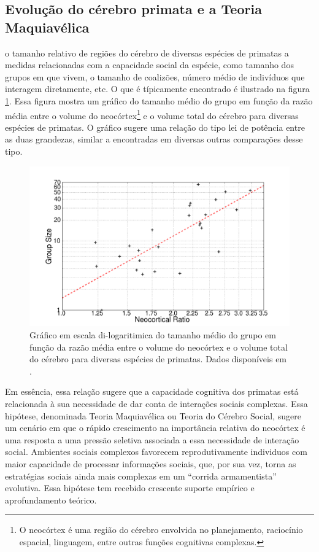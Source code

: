 \subsection{Evolução do cérebro primata e a Teoria Maquiavélica}
 o tamanho relativo de regiões do cérebro de diversas espécies de primatas a medidas relacionadas com a capacidade social da espécie, como tamanho dos grupos em que vivem, o tamanho de coalizões, número médio de indivíduos que interagem diretamente, etc. O que é típicamente encontrado é ilustrado na figura \ref{fig:dunbarlaw}. Essa figura mostra um gráfico do tamanho médio do grupo em função da razão média entre o volume do neocórtex\footnote[][-2cm]{O neocórtex é uma região do cérebro envolvida no planejamento, raciocínio espacial, linguagem, entre outras funções cognitivas complexas.} e o volume total do cérebro para diversas espécies de primatas. O gráfico sugere uma relação do tipo lei de potência entre as duas grandezas, similar a encontradas em diversas outras comparações desse tipo. 
\begin{figure}
	\centering
	\includegraphics[width = \textwidth]{figuras/dunbar.png}
	\caption[Gráfico em escala di-logaritimica do tamanho médio do grupo em função da razão média entre o volume do neocórtex e o volume total do cérebro para diversas espécies de primatas.]{ Gráfico em escala di-logaritimica do tamanho médio do grupo em função da razão média entre o volume do neocórtex e o volume total do cérebro para diversas espécies de primatas. Dados disponíveis em \citep{Dunbar2009}.}
	\label{fig:dunbarlaw}
\end{figure}
Em essência, essa relação sugere que a capacidade cognitiva dos primatas está relacionada à sua necessidade de dar conta de interações sociais complexas. Essa hipótese, denominada Teoria Maquiavélica ou Teoria do Cérebro Social, sugere um cenário em que o rápido crescimento na importância relativa do neocórtex é uma resposta a uma pressão seletiva associada a essa necessidade de interação social. Ambientes sociais complexos favorecem reprodutivamente individuos com maior capacidade de processar informações sociais, que, por sua vez, torna as estratégias sociais ainda mais complexas em um ``corrida armamentista'' evolutiva\cite[-6.5cm]{Byrne1990,Byrne1991,Byrne1992, Whiten2012}. Essa hipótese tem recebido crescente suporte empírico e aprofundamento teórico\cite[-1.5cm]{Dunbar2008, Dunbar2009, Shultz2010}. 
